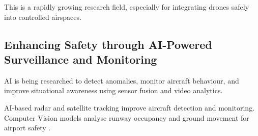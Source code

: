 This is a rapidly growing research field, especially for integrating drones safely into controlled airspaces.


\subsection{Enhancing Safety through AI-Powered Surveillance and Monitoring}

\gls{AI} is being researched to detect anomalies, monitor aircraft behaviour, and improve situational awareness using sensor fusion and video analytics.

\gls{AI}-based radar and satellite tracking improve aircraft detection and monitoring.
Computer Vision models analyse runway occupancy and ground movement for airport safety \cite{Ramachandran_2025}.